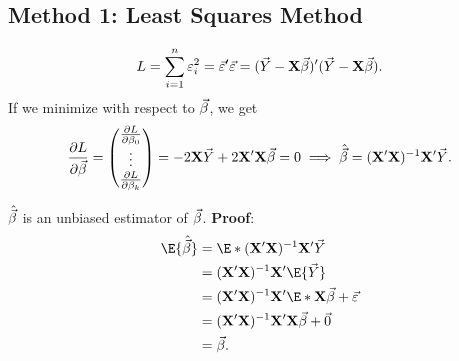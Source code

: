 \subsection*{Method 1: Least Squares Method}
\[ L=\sum_{i=1}^{n}\varepsilon_i^2=\vec{\varepsilon}'\vec{\varepsilon}=
    (\vec{Y}-\mathbf{X}\vec{\beta})'(\vec{Y}-\mathbf{X}\vec{\beta}). \]
If we minimize with respect to $ \vec{\beta} $, we get
\[\pdv{L}{\vec{\beta}} =\begin{pmatrix}
        \pdv{L}{\beta_0} \\
        \vdots           \\
        \pdv{L}{\beta_k}
    \end{pmatrix}         =-2 \mathbf{X}\vec{Y}+2 \mathbf{X}'\mathbf{X}\vec{\beta} =0
    \implies\hat{\vec{\beta}} =(\mathbf{X}'\mathbf{X})^{-1}\mathbf{X}'\vec{Y}.\]
\begin{Theorem}{}{}
    $ \hat{\vec{\beta}} $ is an unbiased estimator of $ \vec{\beta} $.
    \tcblower{}
    \textbf{Proof}:
    \begin{align*}
        \E{\hat{\Vector{\beta}}}
         & =\E*{(\Matrix{X}'\Matrix{X})^{-1}\Matrix{X}'\Vector{Y}}                                    \\
         & =(\Matrix{X}'\Matrix{X})^{-1}\Matrix{X}'\E{\Vector{Y}}                                     \\
         & =(\Matrix{X}'\Matrix{X})^{-1}\Matrix{X}'\E*{\Matrix{X}\Vector{\beta}+\Vector{\varepsilon}} \\
         & =(\Matrix{X}'\Matrix{X})^{-1}\Matrix{X}'\Matrix{X}\Vector{\beta}+\Vector{0}                \\
         & =\Vector{\beta}.
    \end{align*}
\end{Theorem}
